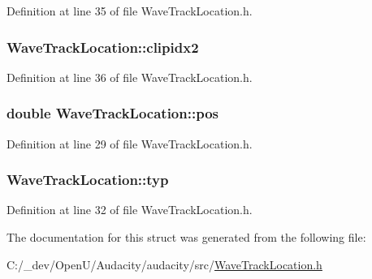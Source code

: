 Definition at line 35 of file Wave\+Track\+Location.\+h.

\subsubsection[{\texorpdfstring{clipidx2}{clipidx2}}]{ Wave\+Track\+Location\+::clipidx2}\hypertarget{struct_wave_track_location_a85a589613b40d26ee6d2107ad0f1b242}{}\label{struct_wave_track_location_a85a589613b40d26ee6d2107ad0f1b242}


Definition at line 36 of file Wave\+Track\+Location.\+h.

\subsubsection[{\texorpdfstring{pos}{pos}}]{\setlength{\rightskip}{0pt plus 5cm}double Wave\+Track\+Location\+::pos}\hypertarget{struct_wave_track_location_ae4ea9c9afd803ade3db38d9ccb2bb15e}{}\label{struct_wave_track_location_ae4ea9c9afd803ade3db38d9ccb2bb15e}


Definition at line 29 of file Wave\+Track\+Location.\+h.

\subsubsection[{\texorpdfstring{typ}{typ}}]{ Wave\+Track\+Location\+::typ}\hypertarget{struct_wave_track_location_a38d3116d13d3787982109693ad523e2a}{}\label{struct_wave_track_location_a38d3116d13d3787982109693ad523e2a}


Definition at line 32 of file Wave\+Track\+Location.\+h.



The documentation for this struct was generated from the following file\+:\begin{DoxyCompactItemize}
\item 
C\+:/\+\_\+dev/\+Open\+U/\+Audacity/audacity/src/\hyperlink{_wave_track_location_8h}{Wave\+Track\+Location.\+h}\end{DoxyCompactItemize}
